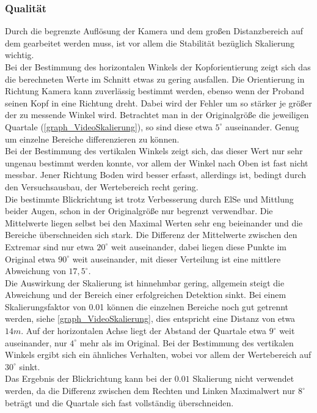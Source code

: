 \subsubsection{Qualität}
Durch die begrenzte Auflösung der Kamera und dem großen Distanzbereich auf dem gearbeitet werden muss, ist vor allem die Stabilität bezüglich Skalierung wichtig.\\
Bei der Bestimmung des horizontalen Winkels der Kopforientierung zeigt sich das die berechneten Werte im Schnitt etwas zu gering ausfallen. Die Orientierung in Richtung Kamera kann zuverlässig bestimmt werden, ebenso wenn der Proband seinen Kopf in eine Richtung dreht. Dabei wird der Fehler um so stärker je größer der zu messende Winkel wird. Betrachtet man in der Originalgröße die jeweiligen Quartale (\autoref{graph_VideoSkalierung}), so sind diese etwa $5^\circ$ auseinander. Genug um einzelne Bereiche differenzieren zu können.\\
Bei der Bestimmung des vertikalen Winkels zeigt sich, das dieser Wert nur sehr ungenau bestimmt werden konnte, vor allem der Winkel nach Oben ist fast nicht messbar. Jener Richtung Boden wird besser erfasst, allerdings ist, bedingt durch den Versuchsausbau, der Wertebereich recht gering.\\
Die bestimmte Blickrichtung ist trotz Verbesserung durch ElSe und Mittlung beider Augen, schon in der Originalgröße nur begrenzt verwendbar. Die Mittelwerte liegen selbst bei den Maximal Werten sehr eng beieinander und die Bereiche überschneiden sich stark. Die Differenz der Mittelwerte zwischen den Extremar sind nur etwa $20^\circ$ weit auseinander, dabei liegen diese Punkte im Original etwa $90^\circ$ weit auseinander, mit dieser Verteilung ist eine mittlere Abweichung von $17,5^\circ$. \\
Die Auswirkung der Skalierung ist hinnehmbar gering, allgemein steigt die Abweichung und der Bereich einer erfolgreichen Detektion sinkt. Bei einem Skalierungsfaktor von 0.01 können die einzelnen Bereiche noch gut getrennt werden, siehe \autoref{graph_VideoSkalierung}, dies entspricht eine Distanz von etwa $14m$. Auf der horizontalen Achse liegt der Abstand der Quartale etwa $9^\circ$ weit auseinander, nur $4^\circ$ mehr als im Original. Bei der Bestimmung des vertikalen Winkels ergibt sich ein ähnliches Verhalten, wobei vor allem der Wertebereich auf $30^\circ$ sinkt.\\
Das Ergebnis der Blickrichtung kann bei der $0.01$ Skalierung nicht verwendet werden, da die Differenz zwischen dem Rechten und Linken Maximalwert nur $8^\circ$ beträgt und die Quartale sich fast vollständig überschneiden.\\
